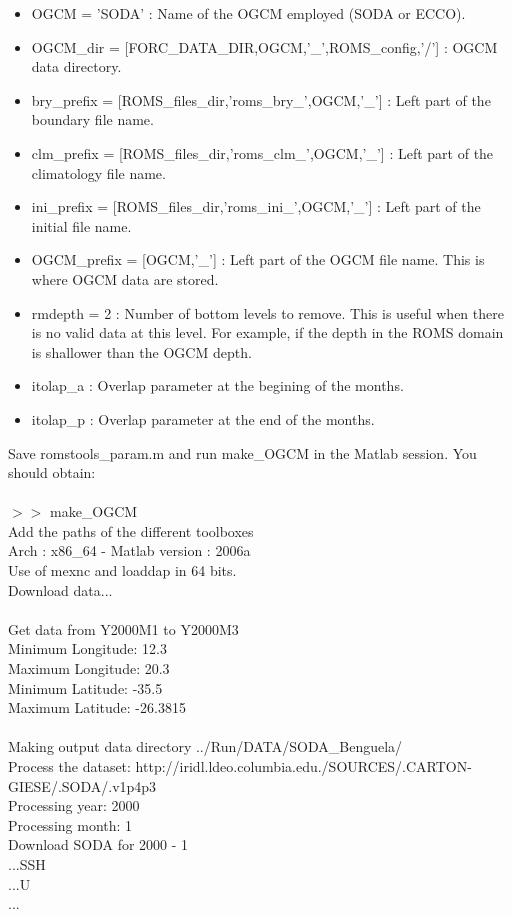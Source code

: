 \begin{itemize}
\item OGCM = 'SODA' : Name of the OGCM employed (SODA or ECCO).
\item OGCM\_dir    = [FORC\_DATA\_DIR,OGCM,'\_',ROMS\_config,'/']  : 
OGCM data directory.
\item bry\_prefix  = [ROMS\_files\_dir,'roms\_bry\_',OGCM,'\_'] : 
Left part of the boundary file name.
\item clm\_prefix  = [ROMS\_files\_dir,'roms\_clm\_',OGCM,'\_'] : 
Left part of the climatology file name.
\item ini\_prefix  = [ROMS\_files\_dir,'roms\_ini\_',OGCM,'\_'] : 
Left part of the initial file name.
\item OGCM\_prefix = [OGCM,'\_'] : 
Left part of the OGCM file name. This is where OGCM data are
stored. 
\item rmdepth = 2 : Number of bottom levels to remove.
This is useful when there is no valid data at this level.
For example, if the depth in the ROMS domain is shallower 
than the OGCM depth.
\item itolap\_a : Overlap parameter at the begining of the months. 
\item itolap\_p : Overlap parameter at the end of the months. 
\end{itemize}
Save romstools\_param.m and run make\_OGCM in the Matlab session.
You should obtain:
\\\\
$>>$ make\_OGCM\\
Add the paths of the different toolboxes\\
Arch : x86\_64 - Matlab version : 2006a\\
Use of mexnc and loaddap in 64 bits.\\
Download data...\\
\\
Get data from Y2000M1 to Y2000M3\\
Minimum Longitude: 12.3\\
Maximum Longitude: 20.3\\
Minimum Latitude: -35.5\\
Maximum Latitude: -26.3815\\
\\
Making output data directory ../Run/DATA/SODA\_Benguela/\\
Process the dataset: http://iridl.ldeo.columbia.edu./SOURCES/.CARTON-GIESE/.SODA/.v1p4p3\\
Processing year: 2000\\
  Processing month: 1\\
    Download SODA for 2000 - 1\\
    ...SSH\\
    ...U\\
...


